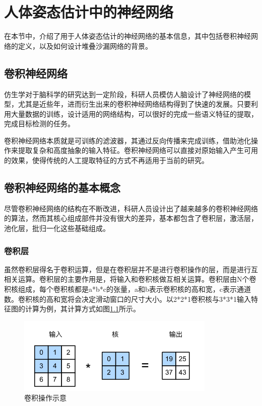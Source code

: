 \chapter{人体姿态估计中的神经网络}

在本节中，介绍了用于人体姿态估计的神经网络的基本信息，其中包括卷积神经网络的定义，以及如何设计堆叠沙漏网络的背景。

\section{卷积神经网络}

仿生学对于脑科学的研究达到一定阶段，科研人员模仿人脑设计了神经网络的模型，尤其是近些年，进而衍生出来的卷积神经网络结构得到了快速的发展。只要利用大量数据的训练，设计适用的网络结构，可以很好的完成一些语义特征的提取，完成目标检测的任务。

卷积神经网络本质就是可训练的滤波器，其通过反向传播来完成训练，借助池化操作来提取复杂和高度抽象的输入特征。卷积神经网络可以直接对原始输入产生可用的效果，使得传统的人工提取特征的方式不再适用于当前的研究。

\section{卷积神经网络的基本概念}

尽管卷积神经网络的结构在不断改进，科研人员设计出了越来越多的卷积神经网络的算法，然而其核心组成部件并没有很大的差异，基本都包含了卷积层，激活层，池化层，批归一化这些基础组成。

\subsection{卷积层}

虽然卷积层得名于卷积运算，但是在卷积层并不是进行卷积操作的层，而是进行互相关运算。卷积层的主要作用是，将输入和卷积核做互相关运算。卷积层由N个卷积核组成，每个卷积核都是a*b*c的张量，a和b表示卷积核的高和宽，c表示通道数。卷积核的高和宽将会决定滑动窗口的尺寸大小。以2*2*1卷积核与3*3*1输入特征图的计算为例，其计算方式如图\ref{Con_layer}所示。

\begin{figure}[h]
	\includegraphics[width=\textwidth]{pic/Con_layer.png}
	\caption{卷积操作示意}
	\label{Con_layer}
\end{figure}

